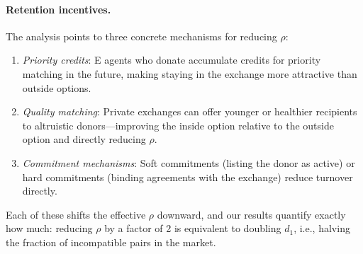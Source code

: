 \documentclass{article}
\theoremstyle{plain}
\theoremstyle{definition}
\begin{document}
\paragraph{Retention incentives.}
The analysis points to three concrete mechanisms for reducing $\rho$:
\begin{enumerate}
\item \emph{Priority credits}: E agents who donate accumulate credits for
  priority matching in the future, making staying in the exchange more
  attractive than outside options.
\item \emph{Quality matching}: Private exchanges can offer younger or
  healthier recipients to altruistic donors---improving the inside option
  relative to the outside option and directly reducing $\rho$.
\item \emph{Commitment mechanisms}: Soft commitments (listing the donor as
  active) or hard commitments (binding agreements with the exchange) reduce
  turnover directly.
\end{enumerate}
Each of these shifts the effective $\rho$ downward, and our results quantify
exactly how much: reducing $\rho$ by a factor of 2 is equivalent to doubling
$d_1$, i.e., halving the fraction of incompatible pairs in the market.
\end{document}
